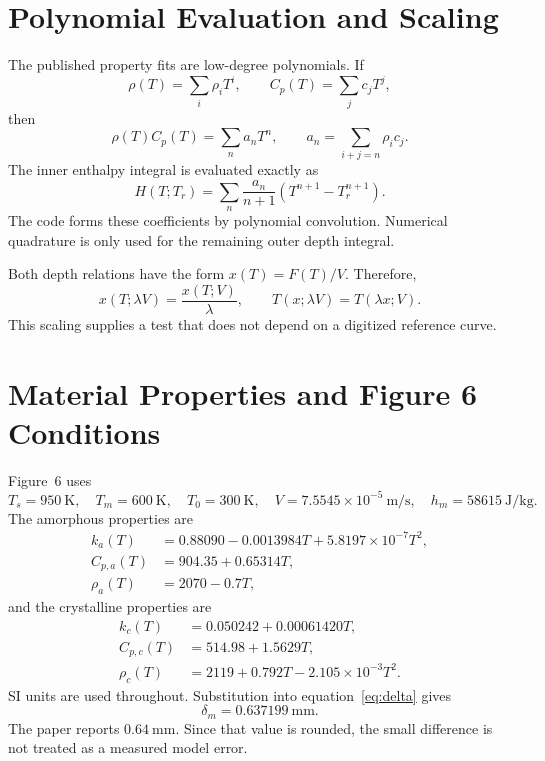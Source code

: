 \documentclass[11pt]{article}
\begin{document}
\section{Polynomial Evaluation and Scaling}
The published property fits are low-degree polynomials. If
\begin{equation}
 \rho(T)=\sum_i\rho_iT^i,
 \qquad
 C_p(T)=\sum_jc_jT^j,
\end{equation}
then
\begin{equation}
 \rho(T)C_p(T)=\sum_na_nT^n,
 \qquad
 a_n=\sum_{i+j=n}\rho_ic_j.
\end{equation}
The inner enthalpy integral is evaluated exactly as
\begin{equation}
 H(T;T_r)=\sum_n\frac{a_n}{n+1}
 \left(T^{n+1}-T_r^{n+1}\right).
 \label{eq:polynomial-enthalpy}
\end{equation}
The code forms these coefficients by polynomial convolution. Numerical
quadrature is only used for the remaining outer depth integral.

Both depth relations have the form $x(T)=F(T)/V$. Therefore,
\begin{equation}
 x(T;\lambda V)=\frac{x(T;V)}{\lambda},
 \qquad
 T(x;\lambda V)=T(\lambda x;V).
 \label{eq:velocity-scaling}
\end{equation}
This scaling supplies a test that does not depend on a digitized reference
curve.

\section{Material Properties and Figure 6 Conditions}
Figure~6 uses
\begin{equation}
 T_s=950\ \mathrm{K},\quad
 T_m=600\ \mathrm{K},\quad
 T_0=300\ \mathrm{K},\quad
 V=7.5545\times10^{-5}\ \mathrm{m/s},\quad
 h_m=58615\ \mathrm{J/kg}.
 \label{eq:figure6-conditions}
\end{equation}
The amorphous properties are
\begin{align}
 k_a(T)&=0.88090-0.0013984T+5.8197\times10^{-7}T^2,\\
 C_{p,a}(T)&=904.35+0.65314T,\\
 \rho_a(T)&=2070-0.7T,
 \label{eq:amorphous-properties}
\end{align}
and the crystalline properties are
\begin{align}
 k_c(T)&=0.050242+0.00061420T,\\
 C_{p,c}(T)&=514.98+1.5629T,\\
 \rho_c(T)&=2119+0.792T-2.105\times10^{-3}T^2.
 \label{eq:crystalline-properties}
\end{align}
SI units are used throughout. Substitution into equation~\eqref{eq:delta}
gives
\begin{equation}
 \delta_m=0.637199\ \mathrm{mm}.
 \label{eq:computed-delta}
\end{equation}
The paper reports $0.64\ \mathrm{mm}$. Since that value is rounded, the small
difference is not treated as a measured model error.
\end{document}
